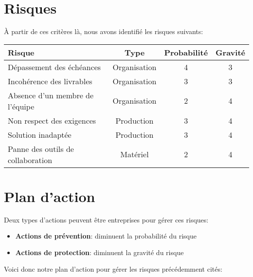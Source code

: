 \newpage

\section{Risques}
À partir de ces critères là, nous avons identifié les risques suivants:

\begin{tabular}{|l||c|c|c|}
   \hline	
	   \textbf{Risque} & \textbf{Type} & \textbf{Probabilité} & \textbf{Gravité} \\ \hline \hline
	   Dépassement des échéances         & Organisation & 4 & 3  \\ \hline
	   Incohérence des livrables         & Organisation & 3 & 3  \\ \hline
  	   Absence d'un membre de l'équipe   & Organisation & 2 & 4  \\ \hline
	   Non respect des exigences         & Production   & 3 & 4  \\ \hline
	   Solution inadaptée                & Production   & 3 & 4  \\ \hline
	   Panne des outils de collaboration & Matériel     & 2 & 4  \\
   \hline
\end{tabular}

\section{Plan d'action}

Deux types d'actions peuvent être entreprises pour gérer ces risques:

\begin{itemize}
  \item \textbf{Actions de prévention}: diminuent la probabilité du risque
  \item \textbf{Actions de protection}: diminuent la gravité du risque
\end{itemize}

Voici donc notre plan d'action pour gérer les risques précédemment cités:

